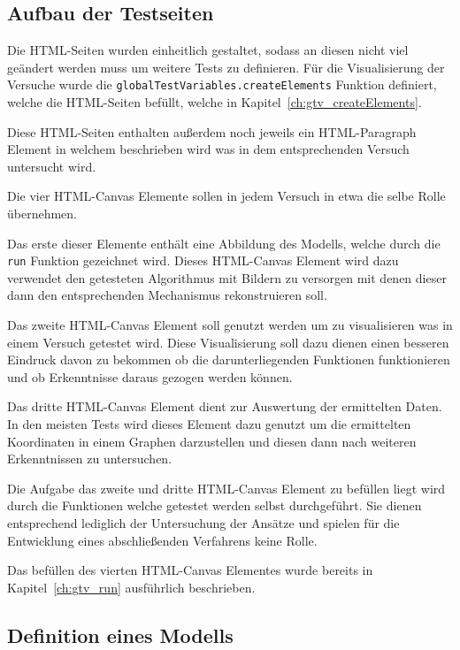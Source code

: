 
\subsection{Aufbau der Testseiten}

Die HTML-Seiten wurden einheitlich gestaltet, sodass an diesen nicht viel geändert werden muss um weitere Tests zu definieren.
Für die Visualisierung der Versuche wurde die \lstinline{globalTestVariables.createElements} Funktion definiert, welche die HTML-Seiten befüllt, welche in Kapitel~\ref{ch:gtv_createElements}.

Diese HTML-Seiten enthalten außerdem noch jeweils ein HTML-Paragraph Element %
in welchem beschrieben wird was in dem entsprechenden Versuch untersucht wird.

Die vier HTML-Canvas Elemente sollen in jedem Versuch in etwa die selbe Rolle übernehmen.

Das erste dieser Elemente enthält eine Abbildung des  Modells, welche durch die \lstinline{run} Funktion gezeichnet wird.
Dieses HTML-Canvas Element wird dazu verwendet den getesteten Algorithmus mit Bildern zu versorgen mit denen dieser dann den entsprechenden Mechanismus rekonstruieren soll.

Das zweite HTML-Canvas Element soll genutzt werden um zu visualisieren was in einem Versuch getestet wird.
Diese Visualisierung soll dazu dienen einen besseren Eindruck davon zu bekommen ob die darunterliegenden Funktionen funktionieren und ob Erkenntnisse daraus gezogen werden können.

Das dritte HTML-Canvas Element dient zur Auswertung der ermittelten Daten.
In den meisten Tests wird dieses Element dazu genutzt um die ermittelten Koordinaten in einem Graphen darzustellen und diesen dann nach weiteren Erkenntnissen zu untersuchen.

Die Aufgabe das zweite und dritte HTML-Canvas Element zu befüllen liegt wird durch die Funktionen welche getestet werden selbst durchgeführt.
Sie dienen entsprechend lediglich der Untersuchung der Ansätze und spielen für die Entwicklung eines abschließenden Verfahrens keine Rolle.

Das befüllen des vierten HTML-Canvas Elementes wurde bereits in Kapitel~\ref{ch:gtv_run} ausführlich beschrieben.

\subsection{Definition eines  Modells}

